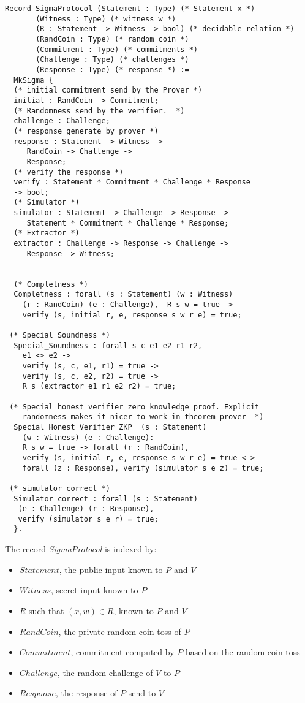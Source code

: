 \begin{verbatim}
Record SigmaProtocol (Statement : Type) (* Statement x *)
       (Witness : Type) (* witness w *)
       (R : Statement -> Witness -> bool) (* decidable relation *)
       (RandCoin : Type) (* random coin *) 
       (Commitment : Type) (* commitments *)
       (Challenge : Type) (* challenges *) 
       (Response : Type) (* response *) :=
  MkSigma {
  (* initial commitment send by the Prover *)
  initial : RandCoin -> Commitment;
  (* Randomness send by the verifier.  *) 
  challenge : Challenge;
  (* response generate by prover *)
  response : Statement -> Witness ->
     RandCoin -> Challenge ->
     Response;
  (* verify the response *)
  verify : Statement * Commitment * Challenge * Response
  -> bool;
  (* Simulator *)
  simulator : Statement -> Challenge -> Response ->
     Statement * Commitment * Challenge * Response;
  (* Extractor *)
  extractor : Challenge -> Response -> Challenge -> 
     Response -> Witness;
  

  (* Completness *)
  Completness : forall (s : Statement) (w : Witness)
    (r : RandCoin) (e : Challenge),  R s w = true -> 
    verify (s, initial r, e, response s w r e) = true;

 (* Special Soundness *)
  Special_Soundness : forall s c e1 e2 r1 r2,
    e1 <> e2 ->
    verify (s, c, e1, r1) = true ->
    verify (s, c, e2, r2) = true ->
    R s (extractor e1 r1 e2 r2) = true;
  
 (* Special honest verifier zero knowledge proof. Explicit 
    randomness makes it nicer to work in theorem prover  *)
  Special_Honest_Verifier_ZKP  (s : Statement) 
    (w : Witness) (e : Challenge): 
    R s w = true -> forall (r : RandCoin), 
    verify (s, initial r, e, response s w r e) = true <->
    forall (z : Response), verify (simulator s e z) = true;
  
 (* simulator correct *)
  Simulator_correct : forall (s : Statement) 
   (e : Challenge) (r : Response),
   verify (simulator s e r) = true;
  }.
\end{verbatim}


\noindent
The record \textit{SigmaProtocol} is indexed by:
\begin{itemize}
\item $Statement$, the public input known to $P$ and $V$
\item $Witness$, secret input known to $P$
\item $R$ such that $(x, w) \in R$, known to $P$ and $V$
\item $RandCoin$, the private random coin toss of $P$
\item $Commitment$, commitment computed by $P$ based on the random coin toss
\item $Challenge$, the random challenge of $V$ to $P$
\item $Response$, the response of $P$ send to $V$
\end{itemize}

